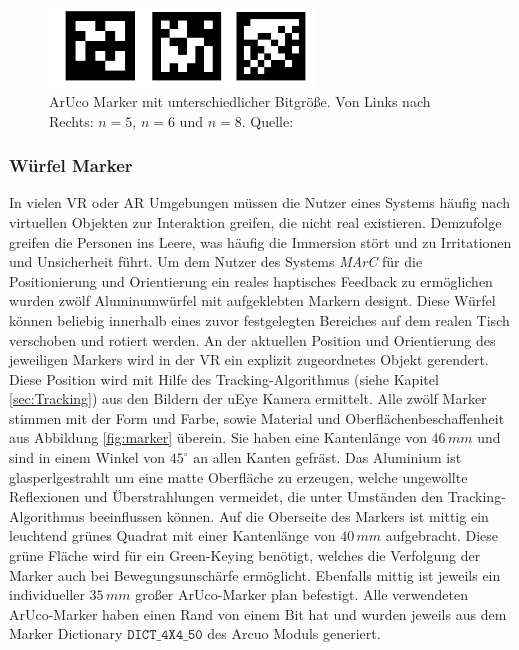 \begin{figure}[H] 
	\center 
	\includegraphics[width=7cm]{Bilder/VerschAruco.jpg}			
	\caption{ArUco Marker mit unterschiedlicher Bitgröße. Von Links nach Rechts: $n=5$, $n=6$ und $n=8$. Quelle: \cite{article:Aruco2014}}
	\label{fig:SizesArucoMarker}
\end{figure}

\subsubsection{Würfel Marker}\label{sec:WürfelMarker}

In vielen VR oder AR Umgebungen müssen die Nutzer eines Systems häufig nach virtuellen Objekten zur Interaktion greifen, die nicht real existieren. Demzufolge greifen die Personen ins Leere, was häufig die Immersion stört und zu Irritationen und Unsicherheit führt.
Um dem Nutzer des Systems \textit{MArC} für die Positionierung und Orientierung ein reales haptisches Feedback zu ermöglichen wurden zwölf Aluminumwürfel mit aufgeklebten Markern designt. Diese Würfel können beliebig innerhalb eines zuvor festgelegten Bereiches auf dem realen Tisch verschoben und rotiert werden. An der aktuellen Position und Orientierung des jeweiligen Markers wird in der VR ein explizit zugeordnetes Objekt gerendert. Diese Position wird mit Hilfe des Tracking-Algorithmus (siehe Kapitel \ref{sec:Tracking}) aus den Bildern der uEye Kamera ermittelt.
Alle zwölf Marker stimmen mit der Form und Farbe, sowie Material und Oberflächenbeschaffenheit aus Abbildung \ref{fig:marker} überein. Sie haben eine Kantenlänge von $46\,mm$ und sind in einem Winkel von $45^\circ$ an allen Kanten gefräst. Das Aluminium ist glasperlgestrahlt um eine matte Oberfläche zu erzeugen, welche ungewollte Reflexionen und Überstrahlungen vermeidet, die unter Umständen den Tracking-Algorithmus beeinflussen können. Auf die Oberseite des Markers ist mittig ein leuchtend grünes Quadrat mit einer Kantenlänge von $40\,mm$ aufgebracht. Diese grüne Fläche wird für ein Green-Keying benötigt, welches die Verfolgung der Marker auch bei Bewegungsunschärfe ermöglicht. Ebenfalls mittig ist jeweils ein individueller $35\,mm$ großer ArUco-Marker plan befestigt. Alle verwendeten ArUco-Marker haben einen Rand von einem Bit hat und wurden jeweils aus dem Marker Dictionary $\texttt{DICT\_4X4\_50}$ des Arcuo Moduls \cite{website:ArucoDoc} generiert.

